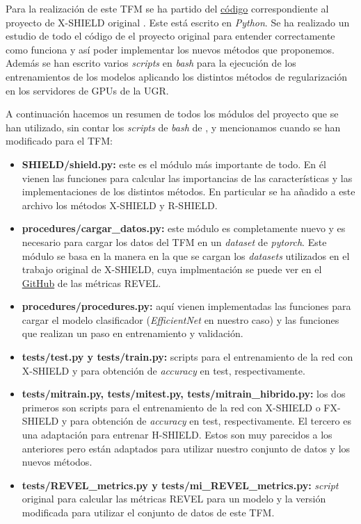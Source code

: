 Para la realización de este TFM se ha partido del \href{https://github.com/isega24/SHIELD/tree/X-SHIELD}{código} correspondiente al proyecto de X-SHIELD original \cite{XSHIELD}. Este está escrito en \textit{Python}. Se ha realizado un estudio de todo el código de el proyecto original para entender correctamente como funciona y así poder implementar los nuevos métodos que proponemos. Además se han escrito varios \textit{scripts} en \textit{bash} para la ejecución de los entrenamientos de los modelos aplicando los distintos métodos de regularización  en los servidores de GPUs de la UGR.

A continuación hacemos un resumen de todos los módulos del proyecto que se han utilizado, sin contar los \textit{scripts} de \textit{bash} de , y mencionamos cuando se han modificado para el TFM:

\begin{itemize}
\item \textbf{SHIELD/shield.py:} este es el módulo más importante de todo. En él vienen las funciones para calcular las importancias de las características y las implementaciones de los distintos métodos. En particular se ha añadido a este archivo los métodos X-SHIELD y R-SHIELD.

\item \textbf{procedures/cargar\_datos.py:} este módulo es completamente nuevo y es necesario para cargar los datos del TFM en un \textit{dataset} de \textit{pytorch}. Este módulo se basa en la manera en la que se cargan los \textit{datasets} utilizados en el trabajo original de X-SHIELD, cuya implmentación se puede ver en el \href{https://github.com/ari-dasci/S-ReVel}{GitHub} de las métricas REVEL.

\item \textbf{procedures/procedures.py:} aquí vienen implementadas las funciones para cargar el modelo clasificador (\textit{EfficientNet} en nuestro caso) y las funciones que realizan un paso en entrenamiento y validación.

\item \textbf{tests/test.py y tests/train.py:} scripts para el entrenamiento de la red con X-SHIELD y para obtención de \textit{accuracy} en test, respectivamente.

\item \textbf{tests/mitrain.py, tests/mitest.py, tests/mitrain\_hibrido.py:} los dos primeros son scripts para el entrenamiento de la red con X-SHIELD o FX-SHIELD y para obtención de \textit{accuracy} en test, respectivamente. El tercero es una adaptación para entrenar H-SHIELD. Estos son muy parecidos a los anteriores pero están adaptados para utilizar nuestro conjunto de datos y los nuevos métodos.

\item \textbf{tests/REVEL\_metrics.py y tests/mi\_REVEL\_metrics.py:} \textit{script} original para calcular las métricas REVEL para un modelo y la versión modificada para utilizar el conjunto de datos de este TFM.
\end{itemize}

